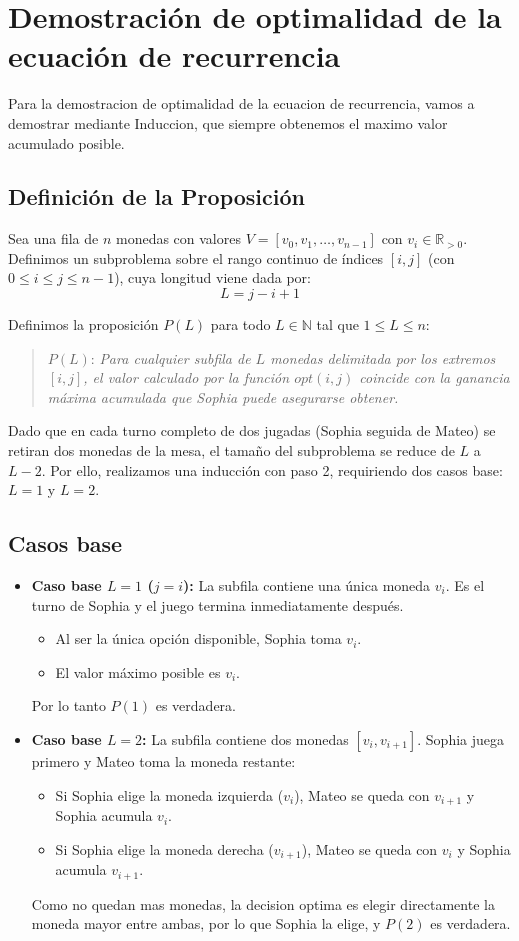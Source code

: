 \section{Demostración de optimalidad de la ecuación de recurrencia}
Para la demostracion de optimalidad de la ecuacion de recurrencia, vamos a demostrar mediante Induccion, que siempre obtenemos el maximo valor acumulado posible.
\subsection{Definición de la Proposición}
Sea una fila de $n$ monedas con valores $V = [v_0, v_1, \dots, v_{n-1}]$ con $v_i \in \mathbb{R}_{> 0}$. Definimos un subproblema sobre el rango continuo de índices $[i, j]$ (con $0 \le i \le j \le n-1$), cuya longitud viene dada por:
$$L = j - i + 1$$

Definimos la proposición $P(L)$ para todo $L \in \mathbb{N}$ tal que $1 \le L \le n$:
\begin{quote}
    $P(L)$: \textit{Para cualquier subfila de $L$ monedas delimitada por los extremos $[i, j]$, el valor calculado por la función $opt(i, j)$ coincide con la ganancia máxima acumulada que Sophia puede asegurarse obtener.}
\end{quote}

Dado que en cada turno completo de dos jugadas (Sophia seguida de Mateo) se retiran dos monedas de la mesa, el tamaño del subproblema se reduce de $L$ a $L - 2$. Por ello, realizamos una inducción con paso 2, requiriendo dos casos base: $L = 1$ y $L = 2$.

\subsection{Casos base}
\begin{itemize}
    \item \textbf{Caso base $L = 1$ ($j = i$):}
    La subfila contiene una única moneda $v_i$. Es el turno de Sophia y el juego termina inmediatamente después.
    \begin{itemize}
        \item Al ser la única opción disponible, Sophia toma $v_i$.
        \item El valor máximo posible es $v_i$.
    \end{itemize}
    Por lo tanto $P(1)$ es verdadera.

    \item \textbf{Caso base $L = 2$:}
    La subfila contiene dos monedas $[v_i, v_{i+1}]$. Sophia juega primero y Mateo toma la moneda restante:
    \begin{itemize}
        \item Si Sophia elige la moneda izquierda ($v_i$), Mateo se queda con $v_{i+1}$ y Sophia acumula $v_i$.
        \item Si Sophia elige la moneda derecha ($v_{i+1}$), Mateo se queda con $v_i$ y Sophia acumula $v_{i+1}$.
    \end{itemize}
    Como no quedan mas monedas, la decision optima es elegir directamente la moneda mayor entre ambas, por lo que Sophia la elige, y $P(2)$ es verdadera.
\end{itemize}

